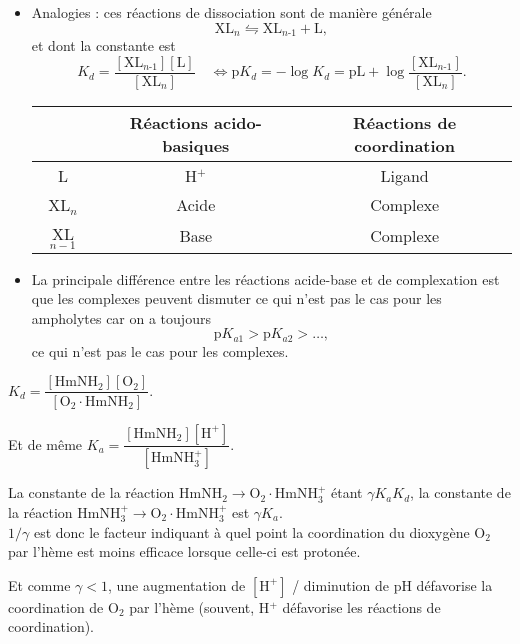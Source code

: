 \begin{solution}
\begin{questions}
    \questioncours
    \begin{itemize}
        \item Analogies : ces réactions de dissociation sont de manière générale
        $$\mathrm{XL_\textit{n} \leftrightharpoons X L_\textit{n-1} + L},$$
        et dont la constante est
        $$K_d = \mathrm{\dfrac{[XL_\textit{n-1}][L]}{[X L_\textit{n}]}} \quad \Longleftrightarrow \text{p}K_d = -\log K_d = \text{pL} + \log\mathrm{\dfrac{[XL_\textit{n-1}]}{[X L_\textit{n}]}}.$$
        \begin{center}\begin{tabular}{c|cc}
             & \textbf{Réactions acido-basiques} & \textbf{Réactions de coordination} \\ \hline\hline
            L & H$^+$ & Ligand \\
            XL$_n$ & Acide & Complexe \\
            XL$_{n-1}$ & Base & Complexe \\
        \end{tabular}\end{center}  
        
        \item La principale différence entre les réactions acide-base et de complexation est que les complexes peuvent dismuter ce qui n'est pas le cas pour les ampholytes car on a toujours
        $$\text{p}K_{a1} > \text{p}K_{a2} > \ldots,$$
        ce qui n'est pas le cas pour les complexes.
    \end{itemize}
    
    \question \hfill $K_d = \mathrm{\dfrac{[HmNH_2][O_2]}{[O_2\cdot HmNH_2]}}.$ \hfill ~
    
    \question Et de même \hfill $K_a = \mathrm{\dfrac{[HmNH_2][H^+]}{[HmNH_3^+]}}.$ \hfill ~
    
    \question La constante de la réaction $\mathrm{HmNH_2 \longrightarrow O_2\cdot HmNH_3^+}$ étant $\gamma K_a K_d$, la constante de la réaction $\mathrm{HmNH_3^+ \longrightarrow O_2\cdot HmNH_3^+}$ est $\gamma K_a$. \\
    $1/\gamma$ est donc le facteur indiquant à quel point la coordination du dioxygène O$_2$ par l'hème est moins efficace lorsque celle-ci est protonée.
    
    \question Et comme $\gamma < 1$, une augmentation de $\mathrm{[H^+]}$ / diminution de pH défavorise la coordination de O$_2$ par l'hème (souvent, H$^+$ défavorise les réactions de coordination).
    

\end{questions}
\end{solution}
